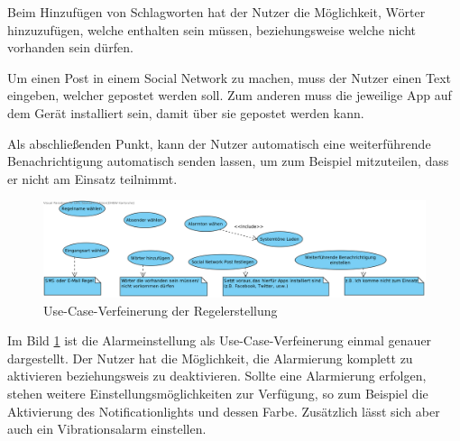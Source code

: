 Beim Hinzuf\"ugen von Schlagworten hat der Nutzer die M\"oglichkeit, W\"orter hinzuzuf\"ugen, welche enthalten sein m\"ussen, beziehungsweise welche nicht vorhanden sein d\"urfen. 

Um einen Post in einem Social Network zu machen, muss der Nutzer einen Text eingeben, welcher gepostet werden soll. Zum anderen muss die jeweilige App auf dem Ger\"at installiert sein, damit \"uber sie gepostet werden kann.

Als abschlie\ss{}enden Punkt, kann der Nutzer automatisch eine weiterf\"uhrende Benachrichtigung automatisch senden lassen, um zum Beispiel mitzuteilen, dass er nicht am Einsatz teilnimmt.
\begin{figure}[!ht]
\centering
\includegraphics[width=16cm]{Bilder/UseCaseRegelerstellung.png}
\caption{Use-Case-Verfeinerung der Regelerstellung}
\label{Regelerstellung Use Case}
\centering
\end{figure}

\FloatBarrier
Im Bild \ref{Regelerstellung Use Case} ist die Alarmeinstellung als Use-Case-Verfeinerung einmal genauer dargestellt. Der Nutzer hat die M\"oglichkeit, die Alarmierung komplett zu aktivieren beziehungsweis zu deaktivieren. Sollte eine Alarmierung erfolgen, stehen weitere Einstellungsm\"oglichkeiten zur Verf\"ugung, so zum Beispiel die Aktivierung des Notificationlights und dessen Farbe. Zus\"atzlich l\"asst sich aber auch ein Vibrationsalarm einstellen.

